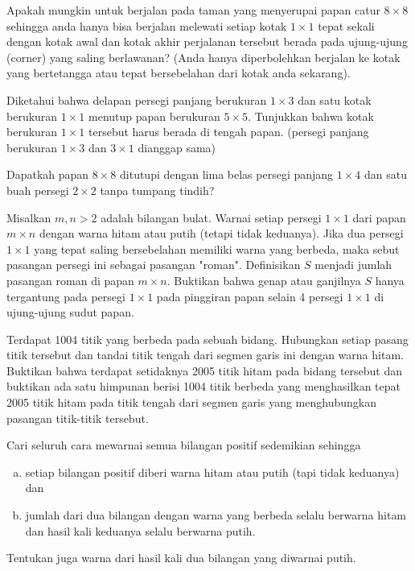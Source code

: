 \documentclass[11pt]{scrartcl}
\begin{document}
\begin{soaljawab}
    Apakah mungkin untuk berjalan pada taman yang menyerupai papan catur $8 \times 8$ sehingga anda hanya bisa berjalan melewati setiap kotak $1 \times 1$ tepat sekali dengan kotak awal dan kotak akhir perjalanan tersebut berada pada ujung-ujung (corner) yang saling berlawanan? (Anda hanya diperbolehkan berjalan ke kotak yang bertetangga atau tepat bersebelahan dari kotak anda sekarang).
\end{soaljawab}

\begin{soaljawab}
    Diketahui bahwa delapan persegi panjang berukuran $1 \times 3$ dan satu kotak berukuran $1 \times 1$ menutup papan berukuran $5 \times 5$. Tunjukkan bahwa kotak berukuran $1 \times 1$ tersebut harus berada di tengah papan. (persegi panjang berukuran $1 \times 3$ dan $3 \times 1$ dianggap sama)
\end{soaljawab}

\begin{soaljawab}
    Dapatkah papan $8\times8$ ditutupi dengan lima belas persegi panjang $1\times4$ dan satu buah persegi $2\times2$ tanpa tumpang tindih?
\end{soaljawab}

\begin{soaljawab}
    Misalkan $m,n > 2$ adalah bilangan bulat. Warnai setiap persegi $1\times1$ dari papan $m\times n$ dengan warna hitam atau putih (tetapi tidak keduanya). Jika dua persegi $1\times1$ yang tepat saling bersebelahan memiliki warna yang berbeda, maka sebut pasangan persegi ini sebagai pasangan "roman". Definisikan $S$ menjadi jumlah pasangan roman di papan $m\times n$. Buktikan bahwa genap atau ganjilnya $S$ hanya tergantung pada persegi $1\times1$ pada pinggiran papan selain 4 persegi $1\times1$ di ujung-ujung sudut papan.
\end{soaljawab}

\begin{soaljawab}
    Terdapat 1004 titik yang berbeda pada sebuah bidang. Hubungkan setiap pasang titik tersebut dan tandai titik tengah dari segmen garis ini dengan warna hitam. Buktikan bahwa terdapat setidaknya 2005 titik hitam pada bidang tersebut dan buktikan ada satu himpunan berisi 1004 titik berbeda yang menghasilkan tepat 2005 titik hitam pada titik tengah dari segmen garis yang menghubungkan pasangan titik-titik tersebut.
\end{soaljawab}

\begin{soaljawab}
    Cari seluruh cara mewarnai semua bilangan positif sedemikian sehingga 
    \begin{enumerate}[(a)]
        \item setiap bilangan positif diberi warna hitam atau putih (tapi tidak keduanya) dan \item jumlah dari dua bilangan dengan warna yang berbeda selalu berwarna hitam dan hasil kali keduanya selalu berwarna putih.
    \end{enumerate}
     
    Tentukan juga warna dari hasil kali dua bilangan yang diwarnai putih.
\end{soaljawab}
\end{document}
